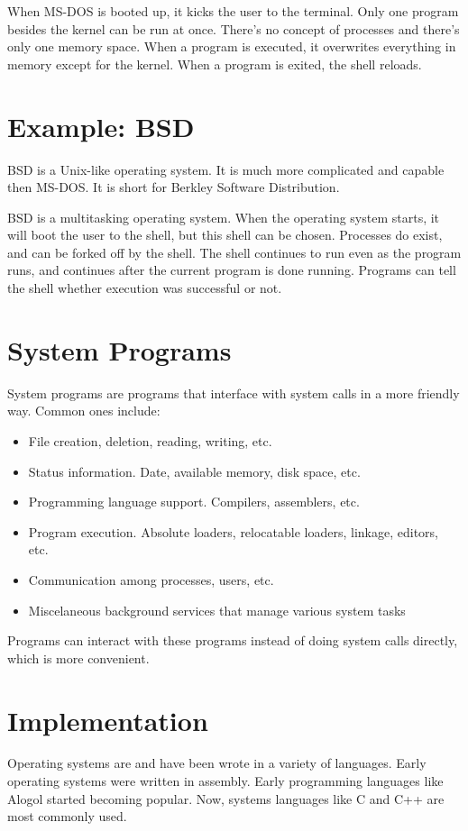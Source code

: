 \documentclass{article}
\begin{document}
When MS-DOS is booted up, it kicks the user to the terminal. Only one program
besides the kernel can be run at once. There's no concept of processes and
there's only one memory space. When a program is executed, it overwrites
everything in memory except for the kernel. When a program is exited, the shell
reloads.

\section{Example: BSD}
BSD is a Unix-like operating system. It is much more complicated and capable
then MS-DOS. It is short for Berkley Software Distribution.

BSD is a multitasking operating system. When the operating system starts, it
will boot the user to the shell, but this shell can be chosen. Processes
do exist, and can be forked off by the shell. The shell continues to run even
as the program runs, and continues after the current program is done running.
Programs can tell the shell whether execution was successful or not.

\section{System Programs}
System programs are programs that interface with system calls in a more
friendly way. Common ones include:

\begin{itemize}
	\item File creation, deletion, reading, writing, etc.
	\item Status information. Date, available memory, disk space, etc.
	\item Programming language support. Compilers, assemblers, etc.
	\item Program execution. Absolute loaders, relocatable loaders,
		linkage, editors, etc.
	\item Communication among processes, users, etc.
	\item Miscelaneous background services that manage various system tasks
\end{itemize}

Programs can interact with these programs instead of doing system calls
directly, which is more convenient.

\section{Implementation}
Operating systems are and have been wrote in a variety of languages. Early
operating systems were written in assembly. Early programming languages like
Alogol started becoming popular. Now, systems languages like C and C++ are most
commonly used.
\end{document}
